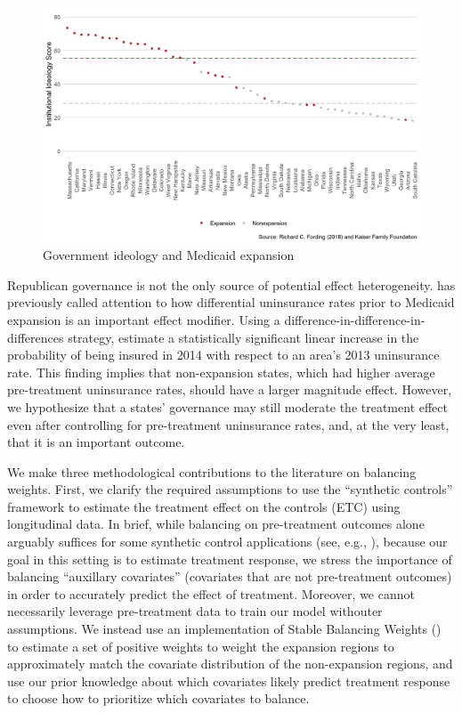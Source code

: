 \begin{figure}[H]
    \begin{center}
    \caption{Government ideology and Medicaid expansion}
    \label{fig:stateideology}
    \includegraphics[scale=0.5]{01_Plots/political-expansion-plot.png}
    \end{center}
\end{figure}

Republican governance is not the only source of potential effect heterogeneity. \cite{courtemanche2017early} has previously called attention to how differential uninsurance rates prior to Medicaid expansion is an important effect modifier. Using a difference-in-difference-in-differences strategy, \cite{courtemanche2017early} estimate a statistically significant linear increase in the probability of being insured in 2014 with respect to an area's 2013 uninsurance rate. This finding implies that non-expansion states, which had higher average pre-treatment uninsurance rates, should have a larger magnitude effect. However, we hypothesize that a states' governance may still moderate the treatment effect even after controlling for pre-treatment uninsurance rates, and, at the very least, that it is an important outcome.

We make three methodological contributions to the literature on balancing weights. First, we clarify the required assumptions to use the ``synthetic controls'' framework to estimate the treatment effect on the controls (ETC) using longitudinal data. In brief, while balancing on pre-treatment outcomes alone arguably suffices for some synthetic control applications (see, e.g., \cite{botosaru2017role}), because our goal in this setting is to estimate treatment response, we stress the importance of balancing ``auxillary covariates'' (covariates that are not pre-treatment outcomes) in order to accurately predict the effect of treatment. Moreover, we cannot necessarily leverage pre-treatment data to train our model withouter assumptions. We instead use an implementation of Stable Balancing Weights (\cite{zubizarreta2015stable}) to estimate a set of positive weights to weight the expansion regions to approximately match the covariate distribution of the non-expansion regions, and use our prior knowledge about which covariates likely predict treatment response to choose how to prioritize which covariates to balance.

